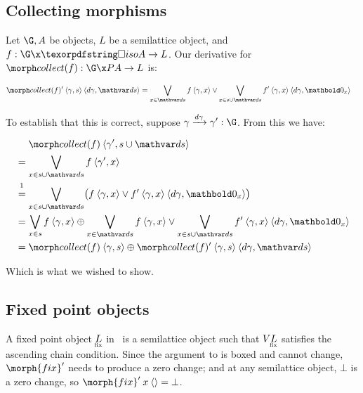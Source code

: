 
\subsection{Collecting morphisms}
\label{sec:CP-collect}

Let $\G, A$ be objects, $L$ be a semilattice object, and $f : \G \x \iso A \to
L$. Our derivative for $\pcollect f : \G \x \pfinof A \to L$ is:

\nopagebreak[2]
\begin{align*}
  \deriv{\pcollect f} \<\tuple{\gamma,s} \<\tuple{\dgamma,\ds}
  &= \bigvee_{x \in \ds} f\<\tuple{\gamma,x} \vee
  \bigvee_{x \in s \cup \ds} \deriv f \<\tuple{\gamma,x} \<\tuple{\dgamma, \zero_x}
\end{align*}

\noindent To establish that this is correct, suppose
$\vld{\dgamma}{\gamma}{\gamma'} : \G$. From this we have:

\nopagebreak[2]
\begin{align*}
  &\phantom{{}={}}\pcollect{f} \<\tuple{\gamma', s \cup \ds}
  \\
  &= \bigvee_{x \in s \cup \ds} f \<\tuple{\gamma', x}
  \\
  &\overset{\footnotemark}{=} \bigvee_{x \in s \cup \ds} \bigl(f \<\tuple{\gamma,x}
  \vee \deriv f \<\tuple{\gamma,x} \<\tuple{\dgamma,\zero_x}\bigr)
  \\
  &= \bigvee_{x \in s} f\<\tuple{\gamma,x}
  \upd \bigvee_{x \in \ds} f\<\tuple{\gamma,x}
  \vee \bigvee_{x \in s \cup \ds} \deriv f \<\tuple{\gamma,x} \<\tuple{\dgamma,\zero_x}
  \\
  &= \pcollect f \<\tuple{\gamma,s}
  \upd \deriv{\pcollect f} \<\tuple{\gamma,s} \<\tuple{\dgamma,\ds}
\end{align*}

\nopagebreak%
\noindent
Which is what we wished to show.


\subsection{Fixed point objects}
\label{sec:CP-fix}

A fixed point object $\fixt L$ in \CP\ is a semilattice object such that
$\vals{\fixt L}$ satisfies the ascending chain condition.  Since the argument to  is boxed and cannot change,
$\deriv{\morph{fix}}$ needs to produce a zero change; and at any semilattice
object, $\bot$ is a zero change, so \( \deriv{\morph{fix}} \<x \<\tuple{} = \bot
\).

